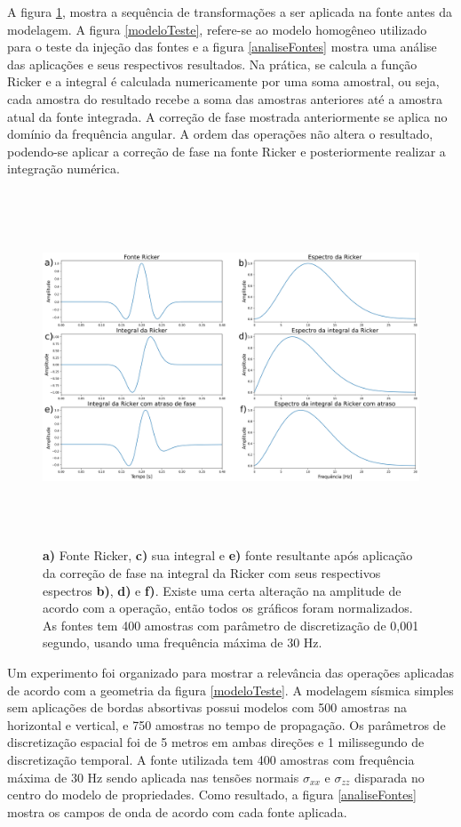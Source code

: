 \documentclass[
	12pt,				%
	openright,			%
	oneside,			%
	a4paper,			%
	english,			%
	brazil				%
	]{abntex2}
\begin{document}
	A figura \ref{wavelets}, mostra a sequência de transformações a ser aplicada na fonte antes da modelagem. A figura \ref{modeloTeste}, refere-se ao modelo homogêneo utilizado para o teste da injeção das fontes e a figura \ref{analiseFontes} mostra uma análise das aplicações e seus respectivos resultados. Na prática, se calcula a função Ricker e a integral é calculada numericamente por uma soma amostral, ou seja, cada amostra do resultado recebe a soma das amostras anteriores até a amostra atual da fonte integrada. A correção de fase mostrada anteriormente se aplica no domínio da frequência angular. A ordem das operações não altera o resultado, podendo-se aplicar a correção de fase na fonte Ricker e posteriormente realizar a integração numérica.           	
%	
    \begin{figure}[htp!]
		\centering
		\includegraphics[width=15cm,height=10.5cm]{../imagens/fontes.png}
		\caption{\textbf{a)} Fonte Ricker, \textbf{c)} sua integral e \textbf{e)} fonte resultante após aplicação da correção de fase na integral da Ricker com seus respectivos espectros \textbf{b)}, \textbf{d)} e \textbf{f)}. Existe uma certa alteração na amplitude de acordo com a operação, então todos os gráficos foram normalizados. As fontes tem 400 amostras com parâmetro de discretização de 0,001 segundo, usando uma frequência máxima de 30 Hz.}
		\label{wavelets}
	\end{figure}	 

	Um experimento foi organizado para mostrar a relevância das operações aplicadas de acordo com a geometria da figura \ref{modeloTeste}. A modelagem sísmica simples sem aplicações de bordas absortivas possui modelos com 500 amostras na horizontal e vertical, e 750 amostras no tempo de propagação. Os parâmetros de discretização espacial foi de 5 metros em ambas direções e 1 milissegundo de discretização temporal. A fonte utilizada tem 400 amostras com frequência máxima de 30 Hz sendo aplicada nas tensões normais $\sigma_{xx}$ e $\sigma_{zz}$ disparada no centro do modelo de propriedades. Como resultado, a figura \ref{analiseFontes} mostra os campos de onda de acordo com cada fonte aplicada.
		
\end{document}
